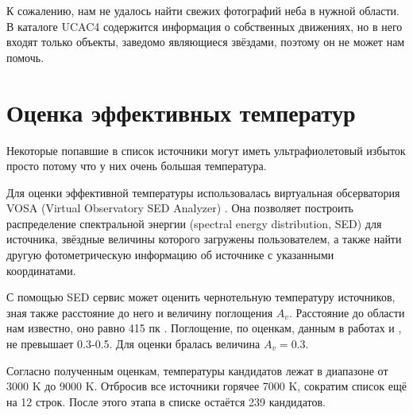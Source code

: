 К сожалению, нам не удалось найти свежих фотографий неба в нужной области. 
В каталоге UCAC4 содержится информация о собственных движениях, но в него входят только объекты, заведомо являющиеся звёздами, поэтому он не может нам помочь.


\section{Оценка эффективных температур}
Некоторые попавшие в список источники могут иметь ультрафиолетовый избыток просто потому что у них очень большая температура. 

Для оценки эффективной температуры использовалась виртуальная обсерватория VOSA (Virtual Observatory SED Analyzer) \cite{bayo2008vosa}. Она позволяет построить распределение спектральной энергии (spectral energy distribution, SED) для источника, звёздные величины которого загружены пользователем, а также найти другую фотометрическую информацию об источнике с указанными координатами.

С помощью SED сервис может оценить чернотельную температуру источников, зная также расстояние до него и величину поглощения $A_v$. Расстояние до области нам известно, оно равно 415 пк \cite{park2012far}. Поглощение, по оценкам, данным в работах \cite{AIGdC2014galex} и \cite{park2012far}, не превышает 0.3-0.5. Для оценки бралась величина $A_v=0.3$.

Согласно полученным оценкам, температуры кандидатов лежат в диапазоне от 3000 K до 9000 K. Отбросив все источники горячее 7000 K, сократим список ещё на 12 строк. После этого этапа в списке остаётся 239 кандидатов.


